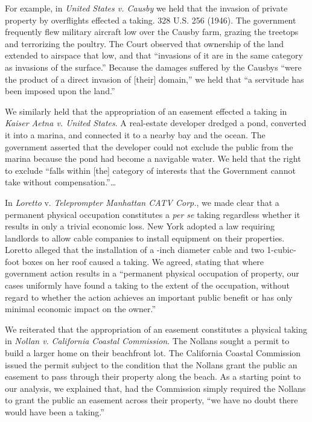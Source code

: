 For example, in \textit{United States v. Causby} we held that the
invasion of private property by overflights effected a taking. 328 U.S. 256
(1946). The government frequently flew military aircraft low over the Causby
farm, grazing the treetops and terrorizing the poultry. The Court observed that
ownership of the land extended to airspace that low, and that ``invasions of it
are in the same category as invasions of the surface.'' Because the damages
suffered by the Causbys ``were the product of a direct invasion of [their]
domain,'' we held that ``a servitude has been imposed upon the land.'' 


We similarly held that the appropriation of an easement effected a taking in
\textit{Kaiser Aetna v. United States}. A real-estate developer dredged
a pond, converted it into a marina, and connected it to a nearby bay and the
ocean. The government asserted that the developer could not exclude the public
from the marina because the pond had become a navigable water. We held that the
right to exclude ``falls within [the] category of interests that the Government
cannot take without compensation.''\ldots

In \textit{Loretto} v. \textit{Teleprompter Manhattan CATV Corp.}, we made clear
that a permanent physical occupation constitutes a \textit{per se} taking
regardless whether it results in only a trivial economic loss. New York adopted
a law requiring landlords to allow cable companies to install equipment on their
properties. Loretto alleged that the installation of a {\textonehalf}-inch
diameter cable and two 1{\textonehalf}-cubic-foot boxes on her roof caused a
taking. We agreed, stating that where government action results in a ``permanent
physical occupation of property, our cases uniformly have found a taking to the
extent of the occupation, without regard to whether the action achieves an
important public benefit or has only minimal economic impact on the owner.''


We reiterated that the appropriation of an easement constitutes a physical
taking in \textit{Nollan v.} \textit{California Coastal Commission}. The Nollans
sought a permit to build a larger home on their beachfront lot. The California
Coastal Commission issued the permit subject to the condition that the Nollans
grant the public an easement to pass through their property along the beach. As
a starting point to our analysis, we explained that, had the Commission simply
required the Nollans to grant the public an easement across their property, ``we
have no doubt there would have been a taking.'' 


